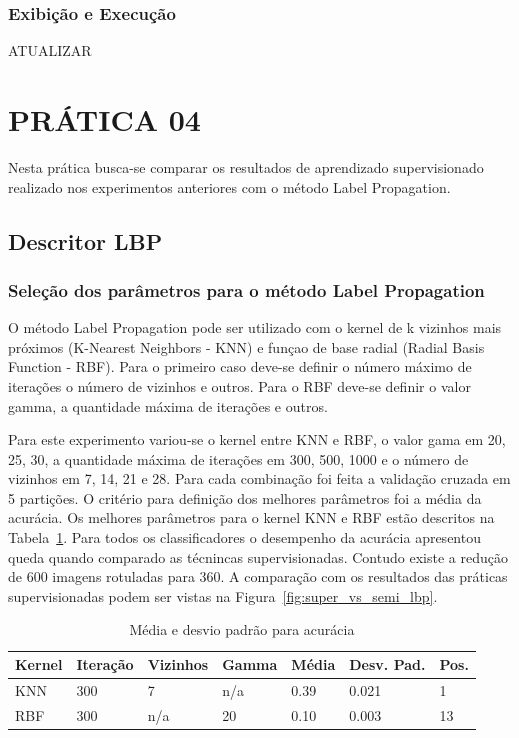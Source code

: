 \documentclass[a4paper, 12 pt, conference]{ieeeconf}  %
\begin{document}
\subsubsection{Exibição e Execução} ATUALIZAR

\section{PRÁTICA 04}
\label{pratica04}
Nesta prática busca-se comparar os resultados de aprendizado supervisionado realizado nos experimentos anteriores com o método Label Propagation.

\subsection{Descritor LBP}
\subsubsection{Seleção dos parâmetros para o método Label Propagation}
O método Label Propagation pode ser utilizado com o kernel de k vizinhos mais próximos (K-Nearest Neighbors - KNN) e funçao de base radial (Radial Basis Function - RBF). Para o  primeiro caso deve-se definir o número máximo de iterações o número de vizinhos e outros. Para o RBF deve-se definir o valor gamma, a quantidade máxima de iterações e outros.

Para este experimento variou-se o kernel entre KNN e RBF, o valor gama em 20, 25, 30, a quantidade máxima de iterações em 300, 500, 1000 e o número de vizinhos em 7, 14, 21 e 28. Para cada combinação foi feita a validação cruzada em 5 partições. O critério para definição dos melhores parâmetros foi a média da acurácia. Os melhores parâmetros para o kernel KNN e RBF estão descritos na Tabela~\ref{tab:meida_acuracia_lp_lbp}. Para todos os classificadores o desempenho da acurácia apresentou queda quando comparado as técnincas supervisionadas. Contudo existe a redução de 600 imagens rotuladas para 360. A comparação com os resultados das práticas supervisionadas podem ser vistas na Figura~\ref{fig:super_vs_semi_lbp}.


\begin{table}[!htbp]
    \caption{Média e desvio padrão para acurácia}
    \begin{center}
        \begin{tabular}{lllllll}
        	Kernel & Iteração & Vizinhos & Gamma &  Média & Desv. Pad. & Pos. \\
        	\hline
        	KNN    & 300             & 7                  & n/a  & 0.39       & 0.021               & 1       \\
        	\hline
        	RBF    & 300             & n/a                & 20   & 0.10       & 0.003               & 13      \\
        \end{tabular}
    \label{tab:meida_acuracia_lp_lbp}
    \end{center}
\end{table}
\end{document}
